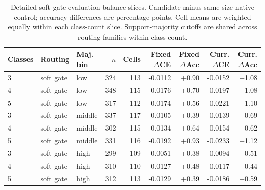 \begin{table}[ht]
\centering\footnotesize
\caption{Detailed soft gate evaluation-balance slices. Candidate minus same-size native control; accuracy differences are percentage points. Cell means are weighted equally within each class-count slice. Support-majority cutoffs are shared across routing families within class count.}\label{tab:balance-soft_gate}
\begin{tabular}{@{}lllrrrrrr@{}}\toprule
Classes & Routing & Maj. bin & $n$ & Cells & Fixed $\Delta$CE & Fixed $\Delta$Acc & Curr. $\Delta$CE & Curr. $\Delta$Acc\\\midrule
3 & soft gate & low & 324 & 113 & -0.0112 & +0.90 & -0.0152 & +1.08\\
4 & soft gate & low & 348 & 115 & -0.0176 & +0.70 & -0.0197 & +1.08\\
5 & soft gate & low & 317 & 112 & -0.0174 & +0.56 & -0.0221 & +1.10\\
3 & soft gate & middle & 337 & 117 & -0.0105 & +0.39 & -0.0139 & +0.69\\
4 & soft gate & middle & 302 & 115 & -0.0134 & +0.64 & -0.0154 & +0.62\\
5 & soft gate & middle & 331 & 116 & -0.0192 & +0.93 & -0.0233 & +1.12\\
3 & soft gate & high & 299 & 109 & -0.0051 & +0.38 & -0.0094 & +0.51\\
4 & soft gate & high & 310 & 110 & -0.0127 & +0.48 & -0.0117 & +0.44\\
5 & soft gate & high & 312 & 113 & -0.0129 & +0.39 & -0.0186 & +0.59\\
\bottomrule\end{tabular}
\end{table}

